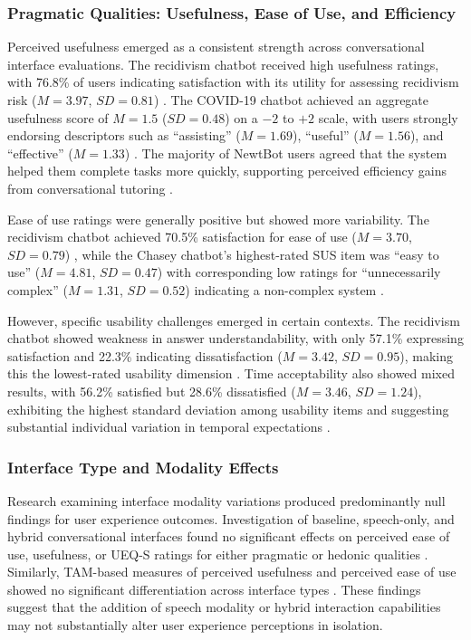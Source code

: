 \documentclass[manuscript,anonymous,sigconf]{acmart}
\begin{document}
\subsubsection{Pragmatic Qualities: Usefulness, Ease of Use, and Efficiency}

Perceived usefulness emerged as a consistent strength across conversational interface evaluations. The recidivism chatbot received high usefulness ratings, with 76.8\% of users indicating satisfaction with its utility for assessing recidivism risk ($M = 3.97$, $SD = 0.81$) \cite{A54}. The COVID-19 chatbot achieved an aggregate usefulness score of $M = 1.5$ ($SD = 0.48$) on a $-2$ to $+2$ scale, with users strongly endorsing descriptors such as ``assisting'' ($M = 1.69$), ``useful'' ($M = 1.56$), and ``effective'' ($M = 1.33$) \cite{A79}. The majority of NewtBot users agreed that the system helped them complete tasks more quickly, supporting perceived efficiency gains from conversational tutoring \cite{A22}.

Ease of use ratings were generally positive but showed more variability. The recidivism chatbot achieved 70.5\% satisfaction for ease of use ($M = 3.70$, $SD = 0.79$) \cite{A54}, while the Chasey chatbot's highest-rated SUS item was ``easy to use'' ($M = 4.81$, $SD = 0.47$) with corresponding low ratings for ``unnecessarily complex'' ($M = 1.31$, $SD = 0.52$) indicating a non-complex system \cite{A79}.

However, specific usability challenges emerged in certain contexts. The recidivism chatbot showed weakness in answer understandability, with only 57.1\% expressing satisfaction and 22.3\% indicating dissatisfaction ($M = 3.42$, $SD = 0.95$), making this the lowest-rated usability dimension \cite{A54}. Time acceptability also showed mixed results, with 56.2\% satisfied but 28.6\% dissatisfied ($M = 3.46$, $SD = 1.24$), exhibiting the highest standard deviation among usability items and suggesting substantial individual variation in temporal expectations \cite{A54}.

\subsubsection{Interface Type and Modality Effects}

Research examining interface modality variations produced predominantly null findings for user experience outcomes. Investigation of baseline, speech-only, and hybrid conversational interfaces found no significant effects on perceived ease of use, usefulness, or UEQ-S ratings for either pragmatic or hedonic qualities \cite{A15}. Similarly, TAM-based measures of perceived usefulness and perceived ease of use showed no significant differentiation across interface types \cite{A15}. These findings suggest that the addition of speech modality or hybrid interaction capabilities may not substantially alter user experience perceptions in isolation.
\end{document}
